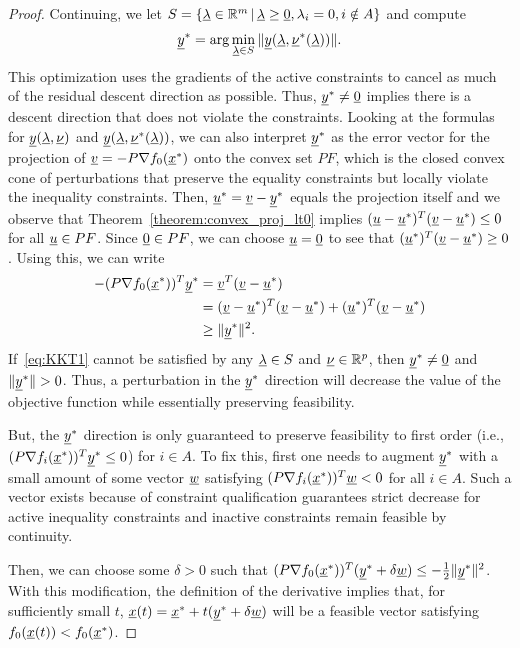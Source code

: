 \begin{proof}
Continuing, we let $S = \{ \underline{\lambda} \in \mathbb{R}^m \, | \, \underline{\lambda} \geq \underline{0}, \lambda_i = 0, i \notin A \}$ and compute \[\underline{y}^* = \arg \min_{\underline{\lambda} \in S} \| \underline{y} (\underline{\lambda},\underline{\nu}^* (\underline{\lambda})) \|. \]
This optimization uses the gradients of the active constraints to cancel as much of the residual descent direction as possible.
Thus, $\underline{y}^* \neq \underline{0}$ implies there is a descent direction that does not violate the constraints.
Looking at the formulas for $\underline{y} (\underline{\lambda},\underline{\nu})$ and $\underline{y} (\underline{\lambda},\underline{\nu}^* (\underline{\lambda}))$, we can also interpret $\underline{y}^*$ as the error vector for the projection of $\underline{v} = -P\nabla f_0 (\underline{x}^*)$ onto the convex set $PF$, which is the closed convex cone of perturbations that preserve the equality constraints but locally violate the inequality constraints.
Then, $\underline{u}^* = \underline{v} - \underline{y}^*$ equals the projection itself and we observe that Theorem~\ref{theorem:convex_proj_lt0} implies $(\underline{u} - \underline{u}^*)^T (\underline{v} - \underline{u}^*) \leq 0$ for all $\underline{u} \in PF$.
Since $\underline{0} \in PF$, we can choose $\underline{u} = \underline{0}$ to see that $(\underline{u}^*)^T (\underline{v} - \underline{u}^*) \geq 0$.
Using this, we can write
\begin{align*}
-(P\nabla f_0 (\underline{x}^*))^T \underline{y}^*
&= \underline{v}^T ( \underline{v} - \underline{u}^*) \\
&= (\underline{v} - \underline{u}^*)^T (\underline{v} - \underline{u}^*) + (\underline{u}^*)^T (\underline{v} - \underline{u}^*) \\
&\geq \|\underline{y}^*\|^2.
\end{align*}
If~\eqref{eq:KKT1} cannot be satisfied by any $\underline\lambda\in S$ and $\underline\nu\in\mathbb R^p$, then $\underline{y}^* \neq \underline{0}$ and $\| \underline{y}^* \| > 0$.
Thus, a perturbation in the $\underline{y}^*$ direction will decrease the value of the objective function while essentially preserving feasibility.

But, the $\underline{y}^*$ direction is only guaranteed to preserve feasibility to first order (i.e., $(P \nabla f_i (\underline{x}^*))^T \underline{y}^*  \leq 0$) for $i \in A$.
To fix this, first one needs to augment $\underline{y}^*$ with a small amount of some vector $\underline{w}$ satisfying $(P \nabla f_i (\underline{x}^*))^T \underline{w} < 0$ for all $i \in A$.
Such a vector exists because of constraint qualification guarantees strict decrease for active inequality constraints and inactive constraints remain feasible by continuity.

Then, we can choose some $\delta>0$ such that $(P\nabla f_0 (\underline{x}^*))^T (\underline{y}^*+\delta \underline{w}) \leq -\frac{1}{2} \|\underline{y}^* \|^2$. With this modification, the definition of the derivative implies that, for sufficiently small $t$, $\underline{x}(t) = \underline{x}^* + t (\underline{y}^* + \delta \underline{w})$ will be a feasible vector satisfying $f_0 (\underline{x}(t)) < f_0 (\underline{x}^*)$.
\end{proof}

